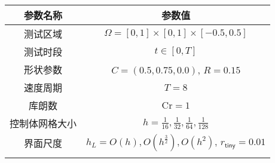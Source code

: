     \begin{tabular}{c|c}
      \hline
      参数名称 & 参数值  \\
      \hline
      测试区域     & $\Omega=[0,1]\times[0,1]\times[-0.5,0.5]$ \\
      测试时段 & $t\in[0,T]$ \\
      形状参数  & $C=(0.5,0.75,0.0)$, $R=0.15$ \\
      速度周期     & $T = 8$  \\
      库朗数 & $\text{Cr}=1$               \\
      控制体网格大小
      & $h = \frac{1}{16}, \frac{1}{32}, \frac{1}{64},  \frac{1}{128}$  \\
      界面尺度
      & $h_L= O(h), O(h^{\frac{3}{2}}), O(h^2)$, $r_{\mathsf{tiny}}=0.01$
      \\
      \hline
      \multicolumn{2}{c}{}\\
    \end{tabular}


